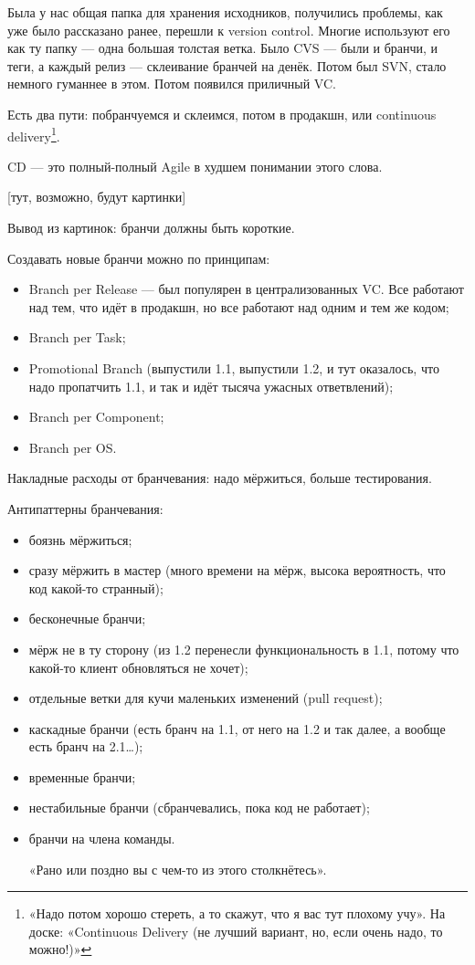 \documentclass[11pt,a4paper]{article}
\begin{document}
Была у нас общая папка для хранения исходников, получились проблемы, как уже было рассказано ранее, перешли к version control. Многие используют его как ту папку — одна большая толстая ветка. Было CVS — были и бранчи, и теги, а каждый релиз — склеивание бранчей на денёк. Потом был SVN, стало немного гуманнее в этом. Потом появился приличный VC.

Есть два пути: побранчуемся и склеимся, потом в продакшн, или continuous delivery\footnote{«Надо потом хорошо стереть, а то скажут, что я вас тут плохому учу». На доске: «Continuous Delivery (не лучший вариант, но, если очень надо, то можно!)»}.

CD — это полный-полный Agile в худшем понимании этого слова.

[тут, возможно, будут картинки]

Вывод из картинок: бранчи должны быть короткие.

Создавать новые бранчи можно по принципам:
\begin{itemize}
\item Branch per Release — был популярен в централизованных VC. Все работают над тем, что идёт в продакшн, но все работают над одним и тем же кодом;
\item Branch per Task;
\item Promotional Branch (выпустили 1.1, выпустили 1.2, и тут оказалось, что надо пропатчить 1.1, и так и идёт тысяча ужасных ответвлений);
\item Branch per Component;
\item Branch per OS.
\end{itemize}

Накладные расходы от бранчевания: надо мёржиться, больше тестирования.

Антипаттерны бранчевания:
\begin{itemize}
\item боязнь мёржиться;
\item сразу мёржить в мастер (много времени на мёрж, высока вероятность, что код какой-то странный);
\item бесконечные бранчи;
\item мёрж не в ту сторону (из 1.2 перенесли функциональность в 1.1, потому что какой-то клиент обновляться не хочет);
\item отдельные ветки для кучи маленьких изменений (pull request);
\item каскадные бранчи (есть бранч на 1.1, от него на 1.2 и так далее, а вообще есть бранч на 2.1…);
\item временные бранчи;
\item нестабильные бранчи (сбранчевались, пока код не работает);
\item бранчи на члена команды.

«Рано или поздно вы с чем-то из этого столкнётесь».
\end{itemize}
\end{document}
